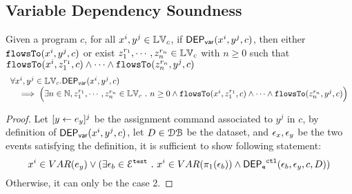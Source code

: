 %
\subsection{Variable Dependency Soundness}
%
\begin{thm}
\label{thm:flowstovardep_sound}
Given a program ${c}$, for all  $ x^i, y^j \in \mathbb{LV}_{{c}}$, if $\mathsf{DEP_{var}}(x^i, y^j, {c})$,
then either $\mathtt{flowsTo}(x^i, y^j, c)$ 
or 
exist $z_1^{r_1}, \cdots, z_n^{r_n} \in \mathbb{LV}_{{c}}$ with $n \geq 0$ such that   
$\mathtt{flowsTo}(x^i,  z_1^{r_1}, c) 
\land \cdots \land \mathtt{flowsTo}(z_n^{r_n}, y^j, c)$
%
\[
\begin{array}{l}
  \forall x^i, y^j \in \mathbb{LV}_{{c}}.
  \mathsf{DEP_{var}}(x^i, y^j, {c})
  \\ \quad \implies
  \Big( \exists n \in \mathbb{N}, z_1^{r_1}, \cdots, z_n^{r_n} \in \mathbb{LV}_{{c}} ~.~ n \geq 0 \land
  \mathtt{flowsTo}(x^i,  z_1^{r_1}, c) 
  \land \cdots \land \mathtt{flowsTo}(z_n^{r_n}, y^j, c) \Big)
\end{array}
\]
\end{thm}
\begin{proof}
Let $[\mathrel{ y \leftarrow e_y }]^j$ be the assignment command associated to $y^j$ in $c$,
by definition of $\mathsf{DEP_{var}}(x^i, y^j, {c})$, let $D \in \mathcal{DB}$ be the dataset,
and $\mathtt{\epsilon}_x, \mathtt{\epsilon}_y$ be the two events satisfying the definition,
it is sufficient to show following statement:
    $$
    x^i \in VAR(e_y)
    \lor 
    (\exists \mathtt{\epsilon}_b \in \mathcal{E}^{\mathtt{{test}}} ~.~ x^i \in VAR(\pi_1(\mathtt{\epsilon}_b)) 
    \land \mathsf{DEP_{\mathtt{e}}}^{\mathtt{{ctl}}}(\mathtt{\epsilon}_b, \mathtt{\epsilon}_y, c, D))
    $$
Otherwise, it can only be the case 2.
\end{proof}

